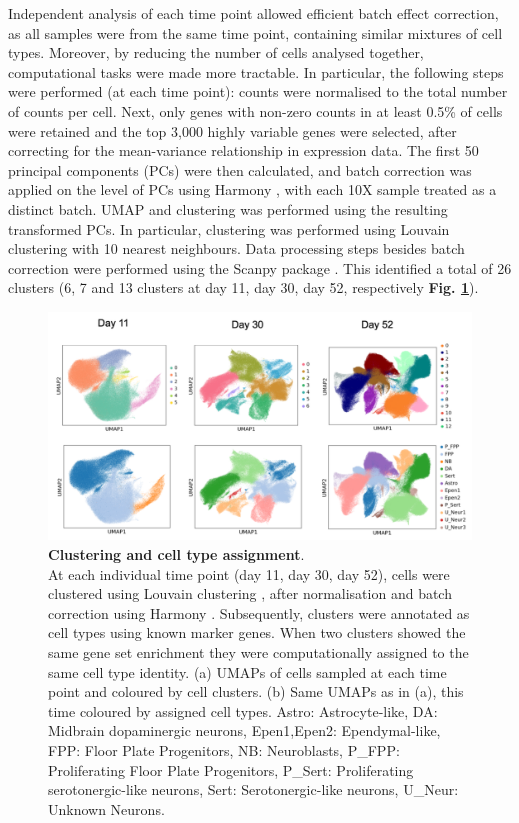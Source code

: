 Independent analysis of each time point allowed efficient batch effect correction, as all samples were from the same time point, containing similar mixtures of cell types.
Moreover, by reducing the number of cells analysed together, computational tasks were made more tractable.
In particular, the following steps were performed (at each time point): counts were normalised to the total number of counts per cell. 
Next, only genes with non-zero counts in at least 0.5\% of cells were retained and the top 3,000 highly variable genes were selected, after correcting for the mean-variance relationship in expression data. 
The first 50 principal components (PCs) were then calculated, and
batch correction was applied on the level of PCs using Harmony \cite{korsunsky2019fast}, with each 10X sample treated as a distinct batch. 
UMAP and clustering was performed using the resulting transformed PCs. 
In particular, clustering was performed using Louvain clustering \cite{blondel2008fast} with 10 nearest neighbours. 
Data processing steps besides batch correction were performed using the Scanpy package \cite{wolf2018scanpy}. 
This identified a total of 26 clusters (6, 7 and 13 clusters at day 11, day 30, day 52, respectively \textbf{Fig. \ref{fig:neuroseq_clusters}}). \\

\begin{figure}[h]
\centering
\includegraphics[width=16cm]{Chapter5/Fig/neuroseq_clusters_celltypes.png}
\caption[Clustering and cell type assignment]{\textbf{Clustering and cell type assignment}.\\
At each individual time point (day 11, day 30, day 52), cells were clustered using Louvain clustering \cite{blondel2008fast}, after normalisation and batch correction using Harmony \cite{korsunsky2019fast}.
Subsequently, clusters were annotated as cell types using known marker genes. 
When two clusters showed the same gene set enrichment they were computationally assigned to the same cell type identity. 
(a) UMAPs of cells sampled at each time point and coloured by cell clusters. 
(b) Same UMAPs as in (a), this time coloured by assigned cell types.
Astro: Astrocyte-like, DA: Midbrain dopaminergic neurons, Epen1,Epen2: Ependymal-like, FPP: Floor Plate Progenitors, NB: Neuroblasts, P\_FPP: Proliferating Floor Plate Progenitors, P\_Sert: Proliferating serotonergic-like neurons, Sert: Serotonergic-like neurons, U\_Neur: Unknown Neurons.}
\label{fig:neuroseq_clusters}
\end{figure}

